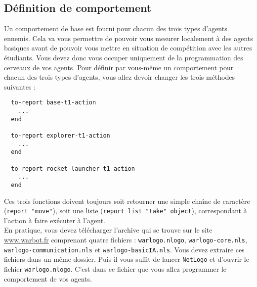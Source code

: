 \documentclass[a4paper,11pt]{article}
\begin{document}
\subsection*{Définition de comportement}

Un comportement de base est fourni pour chacun des trois types d'agents ennemis. Cela va vous
permettre de pouvoir vous mesurer localement à des agents basiques avant de pouvoir vous mettre en
situation de compétition avec les autres étudiants. Vous devez donc vous occuper uniquement de la
programmation des cerveaux de vos agents. Pour définir par vous-même un comportement pour chacun des
trois types d'agents, vous allez devoir changer les trois méthodes suivantes :

\begin{verbatim}
  to-report base-t1-action
    ...
  end
  
  to-report explorer-t1-action
    ...
  end
  
  to-report rocket-launcher-t1-action
    ...
  end
\end{verbatim}

Ces trois fonctions doivent toujours soit retourner une simple chaîne de caractère (\texttt{report
"move"}), soit une liste (\texttt{report list "take" object}), correspondant à l'action à faire
exécuter à l'agent.\\

En pratique, vous devez télécharger l'archive qui se trouve sur le site
\href{http://www.warbot.fr}{www.warbot.fr} comprenant quatre fichiers : \texttt{warlogo.nlogo},
\texttt{warlogo-core.nls}, \texttt{warlogo-communication.nls} et \texttt{warlogo-basicIA.nls}. Vous
devez extraire ces fichiers dans un même dossier. Puis il vous suffit de lancer \texttt{NetLogo} et
d'ouvrir le fichier \texttt{warlogo.nlogo}. C'est dans ce fichier que vous allez programmer le
comportement de vos agents.
\end{document}
